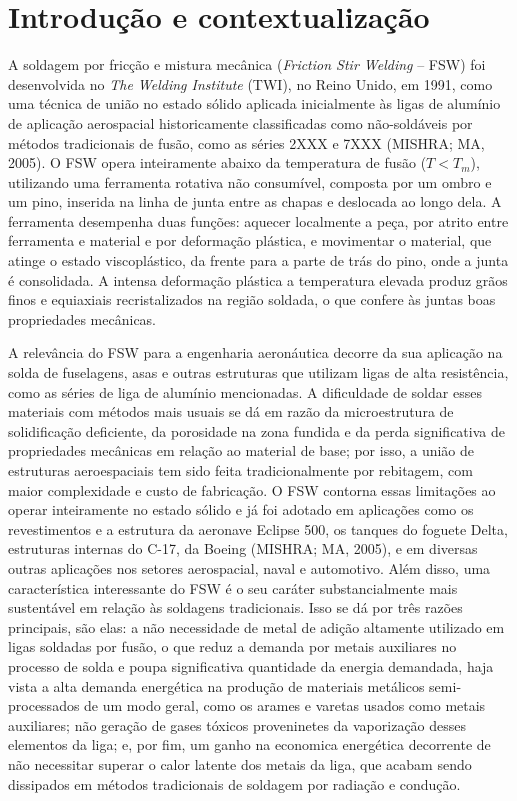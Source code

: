 \documentclass[12pt,openany]{report}
\begin{document}
\chapter{Introdução e contextualização}

A soldagem por fricção e mistura mecânica (\textit{Friction Stir Welding} -- FSW) foi desenvolvida no \textit{The Welding Institute} (TWI), no Reino Unido, em 1991, como uma técnica de união no estado sólido aplicada inicialmente às ligas de alumínio de aplicação aerospacial historicamente classificadas como não-soldáveis por métodos tradicionais de fusão, como as séries 2XXX e 7XXX (MISHRA; MA, 2005). O FSW opera inteiramente abaixo da temperatura de fusão ($T < T_m$), utilizando uma ferramenta rotativa não consumível, composta por um ombro e um pino, inserida na linha de junta entre as chapas e deslocada ao longo dela. A ferramenta desempenha duas funções: aquecer localmente a peça, por atrito entre ferramenta e material e por deformação plástica, e movimentar o material, que atinge o estado viscoplástico, da frente para a parte de trás do pino, onde a junta é consolidada.  A intensa deformação plástica a temperatura elevada produz grãos finos e equiaxiais recristalizados na região soldada, o que confere às juntas boas propriedades mecânicas.


A relevância do FSW para a engenharia aeronáutica decorre da sua aplicação na solda de fuselagens, asas e outras estruturas que utilizam ligas de alta resistência, como as séries de liga de alumínio mencionadas. A dificuldade de soldar esses materiais com métodos mais usuais se dá em razão da microestrutura de solidificação deficiente, da porosidade na zona fundida e da perda significativa de propriedades mecânicas em relação ao material de base; por isso, a união de estruturas aeroespaciais tem sido feita tradicionalmente por rebitagem, com maior complexidade e custo de fabricação. O FSW contorna essas limitações ao operar inteiramente no estado sólido e já foi adotado em aplicações como os revestimentos e a estrutura da aeronave Eclipse 500, os tanques do foguete Delta, estruturas internas do C-17, da Boeing (MISHRA; MA, 2005), e em diversas outras aplicações nos setores aerospacial, naval e automotivo. Além disso, uma característica interessante do FSW é o seu caráter substancialmente mais sustentável em relação às soldagens tradicionais. Isso se dá por três razões principais, são elas: a não necessidade de metal de adição altamente utilizado em ligas soldadas por fusão, o que reduz a demanda por metais auxiliares no processo de solda e poupa significativa quantidade da energia demandada, haja vista a alta demanda energética na produção de materiais metálicos semi-processados de um modo geral, como os arames e varetas usados como metais auxiliares; não geração de gases tóxicos proveninetes da vaporização desses elementos da liga; e, por fim, um ganho na economica energética decorrente de não necessitar superar o calor latente dos metais da liga, que acabam sendo dissipados em métodos tradicionais de soldagem por radiação e condução.
\end{document}
